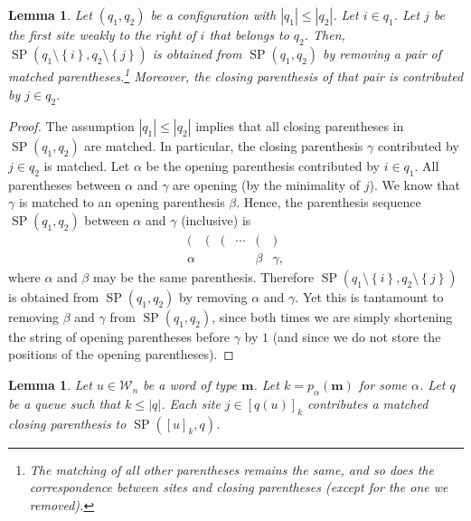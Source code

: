 \documentclass[reqno]{amsart}
\newcommand{\0}{\phantom{c}}
\DeclareMathOperator{\SP}{SP} %
\newcommand{\mm}{\mathbf{m}}
\newcommand{\mcW}{\mathcal{W}}
\newcommand{\set}[1]{\left\{ #1 \right\}}
\newcommand{\abs}[1]{\left| #1 \right|}
\newcommand{\tup}[1]{\left( #1 \right)}
\newcommand{\ive}[1]{\left[ #1 \right]}
\theoremstyle{plain}
\newtheorem{lemma}[thm]{Lemma}
\theoremstyle{definition}
\numberwithin{equation}{section}
\begin{document}
\begin{lemma} \label{lem:SL.dual.1}
Let $\tup{q_1, q_2}$ be a configuration with $\abs{q_1} \leq \abs{q_2}$.
Let $i \in q_1$.
Let $j$ be the first site weakly to the right of $i$ that belongs to $q_2$.
Then, $\SP(q_1 \setminus \set{i}, q_2 \setminus \set{j})$ is obtained from $\SP(q_1, q_2)$ by removing a pair of matched parentheses.\footnote{The matching of all other parentheses remains the same, and so does the correspondence between sites and closing parentheses (except for the one we removed).}
Moreover, the closing parenthesis of that pair is contributed by $j \in q_2$.
\end{lemma}

\begin{proof}
The assumption $\abs{q_1} \leq \abs{q_2}$ implies that all closing parentheses in $\SP(q_1, q_2)$ are matched.
In particular, the closing parenthesis $\gamma$ contributed by $j \in q_2$ is matched.
Let $\alpha$ be the opening parenthesis contributed by $i \in q_1$.
All parentheses between $\alpha$ and $\gamma$ are opening (by the minimality of $j$).
We know that $\gamma$ is matched to an opening parenthesis $\beta$.
Hence, the parenthesis sequence $\SP(q_1, q_2)$ between $\alpha$ and $\gamma$ (inclusive) is
\[
\begin{array}{cccccc}
( & ( & ( & \cdots & ( & ) \\
\alpha & & & & \beta & \gamma,
\end{array}
\]
where $\alpha$ and $\beta$ may be the same parenthesis.
Therefore $\SP(q_1 \setminus \set{i}, q_2 \setminus \set{j})$ is obtained from $\SP(q_1, q_2)$ by removing $\alpha$ and $\gamma$.
Yet this is tantamount to removing $\beta$ and $\gamma$ from $\SP(q_1, q_2)$, since both times we are simply shortening the string of opening parentheses before $\gamma$ by $1$ (and since we do not store the positions of the opening parentheses).
\end{proof}

\begin{lemma} \label{lem:SL.dual.3}
Let $u \in \mcW_n$ be a word of type $\mm$.
Let $k = p_{\alpha}(\mm)$ for some $\alpha$.
Let $q$ be a queue such that $k \leq \abs{q}$.
Each site $j \in \ive{q(u)}_k$ contributes a matched closing parenthesis to $\SP(\ive{u}_k, q)$.
\end{lemma}
\end{document}
